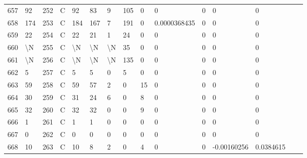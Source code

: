 \begin{longtable}{lllllllllllllll}
	657 & 92                & 252 & C   & 92                & 83                & 9                 & 105  & 0          & 0              & 0              & 0             & 0            \\
	658 & 174               & 253 & C   & 184               & 167               & 7                 & 191  & 0          & 0.0000368435   & 0              & 0             & 0            \\
	659 & 22                & 254 & C   & 22                & 21                & 1                 & 24   & 0          & 0              & 0              & 0             & 0            \\
	660 & \textbackslash{}N & 255 & C   & \textbackslash{}N & \textbackslash{}N & \textbackslash{}N & 35   & 0          & 0              & 0              & 0             & 0            \\
	661 & \textbackslash{}N & 256 & C   & \textbackslash{}N & \textbackslash{}N & \textbackslash{}N & 135  & 0          & 0              & 0              & 0             & 0            \\
	662 & 5                 & 257 & C   & 5                 & 5                 & 0                 & 5    & 0          & 0              & 0              & 0             & 0            \\
	663 & 59                & 258 & C   & 59                & 57                & 2                 & 0    & 15         & 0              & 0              & 0             & 0            \\
	664 & 30                & 259 & C   & 31                & 24                & 6                 & 0    & 8          & 0              & 0              & 0             & 0            \\
	665 & 32                & 260 & C   & 32                & 32                & 0                 & 0    & 9          & 0              & 0              & 0             & 0            \\
	666 & 1                 & 261 & C   & 1                 & 1                 & 0                 & 0    & 0          & 0              & 0              & 0             & 0            \\
	667 & 0                 & 262 & C   & 0                 & 0                 & 0                 & 0    & 0          & 0              & 0              & 0             & 0            \\
	668 & 10                & 263 & C   & 10                & 8                 & 2                 & 0    & 4          & 0              & 0              & -0.00160256   & 0.0384615    \\

\end{longtable}
